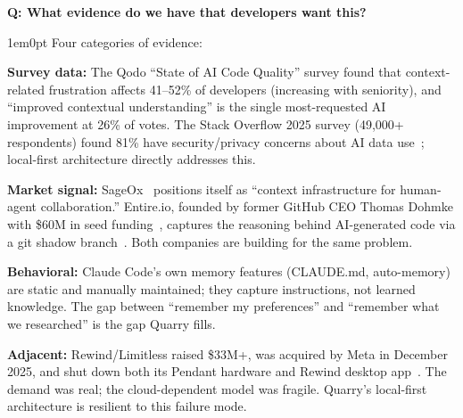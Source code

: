 \documentclass[11pt,letterpaper]{article}
\newcounter{faqnum}
\newenvironment{faqpair}[1]{%
  \needspace{4\baselineskip}%
  \vspace{0.5em}%
  \refstepcounter{faqnum}%
  \noindent\textbf{\color{SectionBlue}Q\thefaqnum: #1}\par\nopagebreak[4]%
  \vspace{0.2em}%
  \begin{adjustwidth}{1em}{0pt}%
  \setlength{\parindent}{0pt}%
}{%
  \end{adjustwidth}%
  \vspace{0.5em}%
}
\begin{document}
\begin{faqpair}{What evidence do we have that developers want this?}\label{faq:evidence}
  Four categories of evidence:

  \textbf{Survey data:} The Qodo ``State of AI Code Quality'' survey found
  that context-related frustration affects 41--52\% of developers (increasing
  with seniority), and ``improved contextual understanding'' is the single
  most-requested AI improvement at 26\% of votes. The Stack Overflow 2025
  survey (49{,}000+ respondents) found 81\% have security/privacy concerns
  about AI data use~\cite{stackoverflow2025survey}; local-first architecture
  directly addresses this.

  \textbf{Market signal:} SageOx~\cite{sageox2026} positions itself as ``context
  infrastructure for human-agent collaboration.'' Entire.io, founded by former
  GitHub CEO Thomas Dohmke with \$60M in seed
  funding~\cite{techcrunch2026entirefunding}, captures the reasoning behind
  AI-generated code via a git shadow branch~\cite{entireio2026github}. Both
  companies are building for the same problem.

  \textbf{Behavioral:} Claude Code's own memory features (CLAUDE.md,
  auto-memory) are static and manually maintained; they capture instructions,
  not learned knowledge. The gap between ``remember my preferences'' and
  ``remember what we researched'' is the gap Quarry fills.

  \textbf{Adjacent:} Rewind/Limitless raised \$33M+, was acquired by Meta in
  December 2025, and shut down both its Pendant hardware and Rewind desktop
  app~\cite{techcrunch2025limitless,9to5mac2025rewindshutdown}. The demand was
  real; the cloud-dependent model was fragile. Quarry's local-first
  architecture is resilient to this failure mode.
\end{faqpair}
\end{document}
